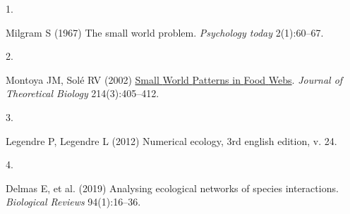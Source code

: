 \documentclass[9pt,twocolumn,twoside,]{pnas-new}
\newlength{\cslhangindent}
\newlength{\csllabelwidth}
\newlength{\cslentryspacingunit} %
\newenvironment{CSLReferences}[2] %
 {%
  \setlength{\parindent}{0pt}
  \ifodd #1
  \let\oldpar\par
  \def\par{\hangindent=\cslhangindent\oldpar}
  \fi
  \setlength{\parskip}{#2\cslentryspacingunit}
 }%
 {}
\newcommand{\CSLLeftMargin}[1]{\parbox[t]{\csllabelwidth}{#1}}
\newcommand{\CSLRightInline}[1]{\parbox[t]{\linewidth - \csllabelwidth}{#1}\break}
\begin{document}
\hypertarget{refs}{}
\begin{CSLReferences}{0}{0}
\leavevmode{}%
\CSLLeftMargin{1. }
\CSLRightInline{Milgram S (1967) The small world problem.
\emph{Psychology today} 2(1):60--67.}

\leavevmode{}%
\CSLLeftMargin{2. }
\CSLRightInline{Montoya JM, Solé RV (2002)
\href{https://doi.org/10.1006/jtbi.2001.2460}{Small {World} {Patterns}
in {Food} {Webs}}. \emph{Journal of Theoretical Biology}
214(3):405--412.}

\leavevmode{}%
\CSLLeftMargin{3. }
\CSLRightInline{Legendre P, Legendre L (2012) Numerical ecology, 3rd
english edition, v. 24.}

\leavevmode{}%
\CSLLeftMargin{4. }
\CSLRightInline{Delmas E, et al. (2019) Analysing ecological networks of
species interactions. \emph{Biological Reviews} 94(1):16--36.}

\end{CSLReferences}



% 
\end{document}
